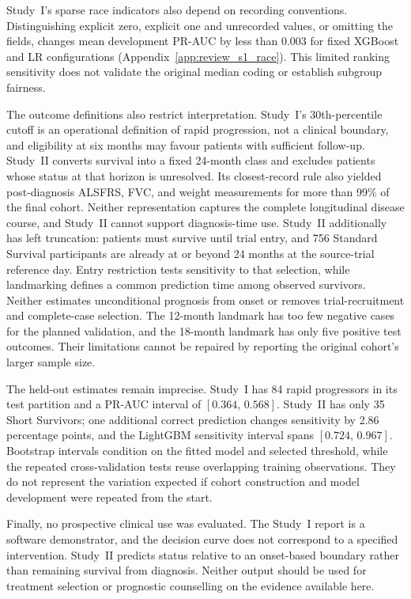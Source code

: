 Study~I's sparse race indicators also depend on recording conventions. Distinguishing explicit zero, explicit one and unrecorded values, or omitting the fields, changes mean development PR-AUC by less than 0.003 for fixed XGBoost and LR configurations (Appendix~\ref{app:review_s1_race}). This limited ranking sensitivity does not validate the original median coding or establish subgroup fairness.

The outcome definitions also restrict interpretation. Study~I's 30th-percentile cutoff is an operational definition of rapid progression, not a clinical boundary, and eligibility at six months may favour patients with sufficient follow-up. Study~II converts survival into a fixed 24-month class and excludes patients whose status at that horizon is unresolved. Its closest-record rule also yielded post-diagnosis ALSFRS, FVC, and weight measurements for more than 99\% of the final cohort. Neither representation captures the complete longitudinal disease course, and Study~II cannot support diagnosis-time use.
Study~II additionally has left truncation: patients must survive until trial entry, and 756 Standard Survival participants are already at or beyond 24 months at the source-trial reference day. Entry restriction tests sensitivity to that selection, while landmarking defines a common prediction time among observed survivors. Neither estimates unconditional prognosis from onset or removes trial-recruitment and complete-case selection. The 12-month landmark has too few negative cases for the planned validation, and the 18-month landmark has only five positive test outcomes. Their limitations cannot be repaired by reporting the original cohort's larger sample size.

The held-out estimates remain imprecise. Study~I has 84 rapid progressors in its test partition and a \gls{PR-AUC} interval of $[0.364,\,0.568]$. Study~II has only 35 Short Survivors; one additional correct prediction changes sensitivity by 2.86 percentage points, and the LightGBM sensitivity interval spans $[0.724,\,0.967]$. Bootstrap intervals condition on the fitted model and selected threshold, while the repeated cross-validation tests reuse overlapping training observations. They do not represent the variation expected if cohort construction and model development were repeated from the start.

Finally, no prospective clinical use was evaluated. The Study~I report is a software demonstrator, and the decision curve does not correspond to a specified intervention. Study~II predicts status relative to an onset-based boundary rather than remaining survival from diagnosis. Neither output should be used for treatment selection or prognostic counselling on the evidence available here.

